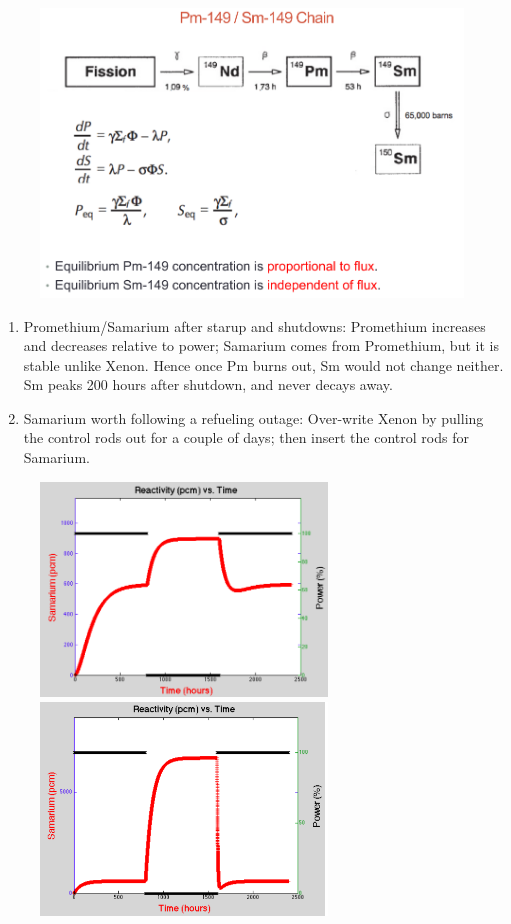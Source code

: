 \documentclass{school-22.211-notes}
\begin{document}
\begin{table}
\begin{tabular}{|p{3in}|p{3in}|}
  \end{tabular}
\end{table}


\clearpage
{}
\begin{figure}[ht]
  \centering
  \includegraphics[width=5in]{images/dfs/Pm-Sm.png}
\end{figure}

\begin{enumerate}
\item Promethium/Samarium after starup and shutdowns: Promethium increases and decreases relative to power; Samarium comes from Promethium, but it is stable unlike Xenon. Hence once Pm burns out, Sm would not change neither. Sm peaks 200 hours after shutdown, and never decays away. 
\item Samarium worth following a refueling outage: Over-write Xenon by pulling the control rods out for a couple of days; then insert the control rods for Samarium. 
\end{enumerate}
\begin{figure}[ht]
  \centering
  \includegraphics[width=3in]{images/dfs/Pm-Sm-1.png} 
  \includegraphics[width=3in]{images/dfs/Pm-Sm-2.png} 
\end{figure}
\end{document}

